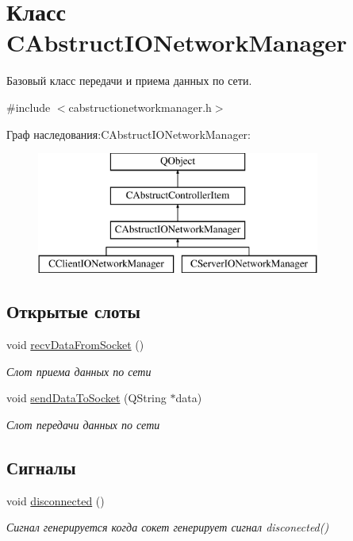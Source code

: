 \hypertarget{class_c_abstruct_i_o_network_manager}{}\section{Класс C\+Abstruct\+I\+O\+Network\+Manager}
\label{class_c_abstruct_i_o_network_manager}


Базовый класс передачи и приема данных по сети.  




{\ttfamily \#include $<$cabstructionetworkmanager.\+h$>$}

Граф наследования\+:C\+Abstruct\+I\+O\+Network\+Manager\+:\begin{figure}[H]
\begin{center}
\leavevmode
\includegraphics[height=4.000000cm]{class_c_abstruct_i_o_network_manager}
\end{center}
\end{figure}
\subsection*{Открытые слоты}
\begin{DoxyCompactItemize}
\item 
void \hyperlink{class_c_abstruct_i_o_network_manager_a78756fc08ed619162da210a9cfc09208}{recv\+Data\+From\+Socket} ()
\begin{DoxyCompactList}\small\item\em Слот приема данных по сети \end{DoxyCompactList}\item 
void \hyperlink{class_c_abstruct_i_o_network_manager_a7e6c20ce1264c76a2cc66114f8490629}{send\+Data\+To\+Socket} (Q\+String $\ast$data)
\begin{DoxyCompactList}\small\item\em Слот передачи данных по сети \end{DoxyCompactList}\end{DoxyCompactItemize}
\subsection*{Сигналы}
\begin{DoxyCompactItemize}
\item 
void \hyperlink{class_c_abstruct_i_o_network_manager_a4c25afd753612c5c719944a3e8ef4373}{disconnected} ()
\begin{DoxyCompactList}\small\item\em Сигнал генерируется когда сокет генерирует сигнал disconected() \end{DoxyCompactList}\end{DoxyCompactItemize}
